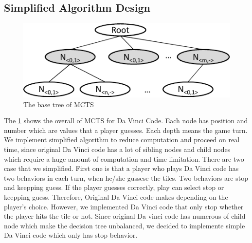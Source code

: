 \documentclass[conference]{IEEEtran}
\begin{document}
\subsection{Simplified Algorithm Design}

\begin{figure}
\includegraphics[width=0.95\columnwidth]{figures/base_tree.pdf}
\caption{The base tree of MCTS}
\label{fig:base_tree}
\end{figure}

The \cref{fig:base_tree} shows the overall of MCTS for Da Vinci Code. 
Each node has position and number which are values that a player guesses. Each depth means the game turn. 
We implement simplified algorithm to reduce computation and proceed on real time, since original Da Vinci code has a lot of sibling nodes and child nodes which require a huge amount of computation and time limitation. 
There are two case that we simplified. 
First one is that a player who plays Da Vinci code has two behaviors in each turn, when he/she gussese the tiles. 
Two behaviors are stop and keepping guess. 
If the player guesses correctly, play can select stop or keepping guess. 
Therefore, Original Da Vinci code makes depending on the player's choice. 
However, we implemented Da Vinci code that only stop whether the player hits the tile or not. 
Since original Da vinci code has numerous of child node which make the decision tree unbalanced, we decided to implemente simple Da Vinci code which only has stop behavior.
 
\end{document}
